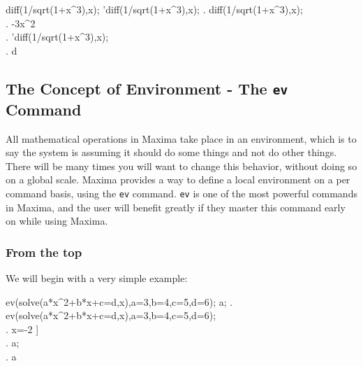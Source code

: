 \vspace{3ex}

\label{Evaluation Toggle (Example 6)}

\beginmaximasession
diff(1/sqrt(1+x^3),x);
'diff(1/sqrt(1+x^3),x);
\maximatexsession
{}.  diff(1/sqrt(1+x^3),x); \\
.   -{{3\*x^{2}}} \\
.  'diff(1/sqrt(1+x^3),x); \\
.   {{d}} \\
\endmaximasession

\vspace{3ex}

\subsection{The Concept of Environment - The \texttt{ev} Command}

All mathematical operations in Maxima take place in an environment,
which is to say the system is assuming it should do some things and
not do other things. There will be many times you will want to change
this behavior, without doing so on a global scale. Maxima provides
a way to define a local environment on a per command basis, using
the \texttt{ev} command. \texttt{ev} is one of the most powerful commands
in Maxima, and the user will benefit greatly if they master this command
early on while using Maxima. 


\subsubsection{From the top}

We will begin with a very simple example:

\vspace{3ex}

\label{Basic Use of ev Command (Example 7)}

\beginmaximasession
ev(solve(a*x^2+b*x+c=d,x),a=3,b=4,c=5,d=6);
a;
\maximatexsession
{}.  ev(solve(a*x^2+b*x+c=d,x),a=3,b=4,c=5,d=6); \\
.   \left[ x=-{{\sqrt{7}+2}\over{3}},\linebreak[0]x={{-2
 }} \right]  \\
.  a; \\
.   a \\
\endmaximasession

\vspace{3ex}

